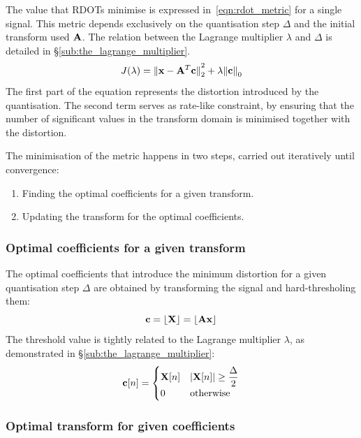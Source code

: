 \documentclass[11pt,a4paper,openright,twoside]{book}
\numberwithin{equation}{section} %
\numberwithin{figure}{section} %
\numberwithin{table}{section} %
\begin{document}
The value that \acp{RDOT} minimise is expressed
in~\eqref{eqn:rdot_metric} for a single signal.
This metric depends exclusively on the quantisation step $\Delta$ and the
initial transform used $\mathbf{A}$.
The relation between the Lagrange multiplier $\lambda$ and $\Delta$ is
detailed in \S\ref{sub:the_lagrange_multiplier}.
\begin{equation}
	J (\lambda) =
	{\Vert \mathbf{x} - \mathbf{A}^T \mathbf{c} \Vert}_2^2 + \lambda{\Vert \mathbf{c}\Vert}_0
	\label{eqn:rdot_metric}
\end{equation}
The first part of the equation represents the distortion introduced by
the quantisation.
The second term serves as rate-like constraint, by ensuring that the
number of significant values in the transform domain is minimised together
with the distortion.

The minimisation of the metric happens in two steps, carried out iteratively
until convergence:
\begin{enumerate}
	\item Finding the optimal coefficients for a given transform.
	\item Updating the transform for the optimal coefficients.
\end{enumerate}

\subsubsection{Optimal coefficients for a given transform}
\label{ssub:optimal_coefficients_for_a_given_transform}

The optimal coefficients that introduce the minimum distortion for a given
quantisation step $\Delta$ are obtained by transforming the signal and
hard-thresholing them:
\begin{equation}
	\mathbf{c} = \lfloor \mathbf{X} \rfloor = \lfloor \mathbf{A} \mathbf{x} \rfloor
\end{equation}
The threshold value is tightly related to the Lagrange multiplier $\lambda$,
as demonstrated in \S\ref{sub:the_lagrange_multiplier}:
\begin{equation}
	\mathbf{c}[n] =
	\begin{cases}
		\mathbf{X}[n] & \vert \mathbf{X}[n] \vert \ge \displaystyle \frac{\Delta}{2} \\
		0     & \text{otherwise} \\
	\end{cases}
	\label{eqn:hard_threshold}
\end{equation}

\subsubsection{Optimal transform for given coefficients}
\label{ssub:optimal_transform_for_given_coefficients}
\end{document}
